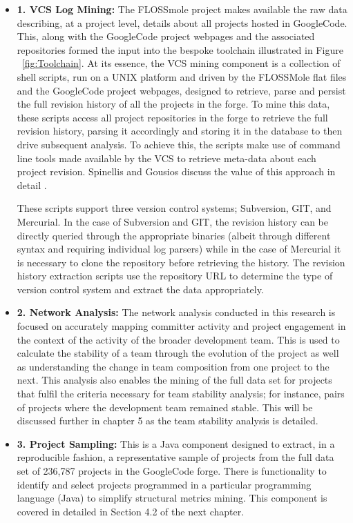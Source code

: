 \begin{itemize}
\item \textbf{1. VCS Log Mining:} The FLOSSmole project makes available the raw data describing, at a project level, details about all projects hosted in GoogleCode. This, along with the GoogleCode project webpages and the associated repositories formed the input into the bespoke toolchain illustrated in Figure ~\ref{fig:Toolchain}. At its essence, the VCS mining component is a collection of shell scripts, run on a UNIX platform and driven by the FLOSSMole flat files and the GoogleCode project webpages, designed to retrieve, parse and persist the full revision history of all the projects in the forge. To mine this data, these scripts access all project repositories in the forge to retrieve the full revision history, parsing it accordingly and storing it in the database to then drive subsequent analysis. To achieve this, the scripts make use of command line tools made available by the VCS to retrieve meta-data about each project revision. Spinellis and Gousios discuss the value of this approach in detail \citep{spinellis2018analyze}.

These scripts support three version control systems; Subversion, GIT, and Mercurial. In the case of Subversion and GIT, the revision history can be directly queried through the appropriate binaries (albeit through different syntax and requiring individual log parsers) while in the case of Mercurial it is necessary to clone the repository before retrieving the history. The revision history extraction scripts use the repository URL to determine the type of version control system and extract the data appropriately.

\item \textbf{2. Network Analysis:} The network analysis conducted in this research is focused on accurately mapping committer activity and project engagement in the context of the activity of the broader development team. This is used to calculate the stability of a team through the evolution of the project as well as understanding the change in team composition from one project to the next. This analysis also enables the mining of the full data set for projects that fulfil the criteria necessary for team stability analysis; for instance, pairs of projects where the development team remained stable. This will be discussed further in chapter 5 as the team stability analysis is detailed.

\item \textbf{3. Project Sampling:} This is a Java component designed to extract, in a reproducible fashion, a representative sample of projects from the full data set of 236,787 projects in the GoogleCode forge. There is functionality to identify and select projects programmed in a particular programming language (Java) to simplify structural metrics mining. This component is covered in detailed in Section 4.2 of the next chapter.


\end{itemize}
